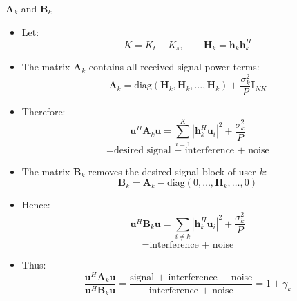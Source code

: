 \documentclass{beamer}
\begin{document}
\begin{frame}{\(\mathbf{A}_k\) and \(\mathbf{B}_k\)}
\small

\begin{itemize}
    \item Let:
    \[
        K = K_t + K_s,
        \qquad
        \mathbf{H}_k = \mathbf{h}_k\mathbf{h}_k^H
    \]

    \item The matrix $\mathbf{A}_k$ contains all received signal power terms:
    \[
        \mathbf{A}_k
        =
        \mathrm{diag}
        (\mathbf{H}_k,\mathbf{H}_k,\ldots,\mathbf{H}_k)
        +
        \frac{\sigma_k^2}{P}\mathbf{I}_{NK}
    \]

    \item Therefore:
    \[
        \mathbf{u}^H\mathbf{A}_k\mathbf{u}
        =
        \sum_{i=1}^{K}
        |\mathbf{h}_k^H\mathbf{u}_i|^2
        +
        \frac{\sigma_k^2}{P}
    \]
    \[
        =
        \text{desired signal + interference + noise}
    \]

    \item The matrix $\mathbf{B}_k$ removes the desired signal block of user $k$:
    \[
        \mathbf{B}_k
        =
        \mathbf{A}_k
        -
        \mathrm{diag}
        (0,\ldots,\mathbf{H}_k,\ldots,0)
    \]

    \item Hence:
    \[
        \mathbf{u}^H\mathbf{B}_k\mathbf{u}
        =
        \sum_{i\neq k}
        |\mathbf{h}_k^H\mathbf{u}_i|^2
        +
        \frac{\sigma_k^2}{P}
    \]
    \[
        =
        \text{interference + noise}
    \]
\end{itemize}
\end{frame}

\begin{frame}{}
\begin{itemize}
    \item Thus:
    \[
        \frac{\mathbf{u}^H\mathbf{A}_k\mathbf{u}}
        {\mathbf{u}^H\mathbf{B}_k\mathbf{u}}
        =
        \frac{\text{signal + interference + noise}}
        {\text{interference + noise}}
        =
        1+\gamma_k
    \]
\end{itemize}
\end{frame}
\end{document}
